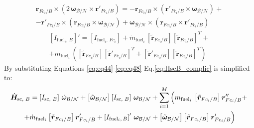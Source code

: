 \begin{multline}\label{eq:eq47}
	\bm{r}_{Fc_i/B} \times \left(2\,\bm{\omega}_{\mathcal{B}/\mathcal{N}} \times \bm{r}'_{Fc_i/B}\right) =-\bm{r}_{Fc_i/B} \times \left( \bm{r}'_{Fc_i/B} \times \bm{\omega}_{\mathcal{B}/\mathcal{N}}\right) 
	+\\-\bm{r}'_{Fc_i/B} \times \left( \bm{r}_{Fc_i/B} \times \bm{\omega}_{\mathcal{B}/\mathcal{N}}\right) + \bm{\omega}_{\mathcal{B}/\mathcal{N}} \times \left(\bm{r}_{Fc_i/B}\times \bm{r}'_{Fc_i/B}\right)
\end{multline}
\begin{multline}\label{eq:eq48}
	\left[I_{\text{fuel}_i,\,B}\right]'= \left[I_{\text{fuel}_i,\,Fc_i}\right] + \dot{m}_{\text{fuel}_i}\, \left[\tilde{\bm{r}}_{Fc_i/B}\right]\left[\tilde{\bm{r}}_{Fc_i/B}\right]^T +\\+ m_{\text{fuel}_i}\, \left(\left[\tilde{\bm{r}}_{Fc_i/B}\right]\left[\tilde{\bm{r}}'_{Fc_i/B}\right]^T+ \left[\tilde{\bm{r}}'_{Fc_i/B}\right]\left[\tilde{\bm{r}}_{Fc_i/B}\right]^T\right)
\end{multline}
By substituting Equations \eqref{eq:eq44}-\eqref{eq:eq48} Eq.\eqref{eq:HscB_complic} is simplified to:
\begin{multline}\label{eq:eq49}
	\dot{\bm{H}}_{\text{sc, }B} = \left[I_{\text{sc, }B}\right]\,\dot{\bm{\omega}}_{\cal{B}/\cal{N}} + \left[\tilde{\bm{\omega}}_{\cal{B}/\cal{N}}\right]\left[I_{\text{sc, }B}\right]\,\bm{\omega}_{\cal{B}/\cal{N}} + \sum_{i=1}^{M}\left(m_{\text{fuel}_i}\,\left[\tilde{\bm{r}}_{Fc_i/B}\right] \bm{r}''_{Fc_i/B} +\right. \\
	\left.+ \dot{m}_{\text{fuel}_i} \left[\tilde{\bm{r}}_{Fc_i/B}\right]\bm{r}'_{Fc_i/B}+ \left[I_{\text{fuel}_i,\,B}\right]' \, \bm{\omega}_{\cal{B}/\cal{N}}
	+ \left[\tilde{\bm{\omega}}_{\mathcal{B}/\mathcal{N}}\right] \left[\tilde{\bm{r}}_{Fc_i/B}\right] \bm{r}'_{Fc_i/B}\right)
\end{multline}

